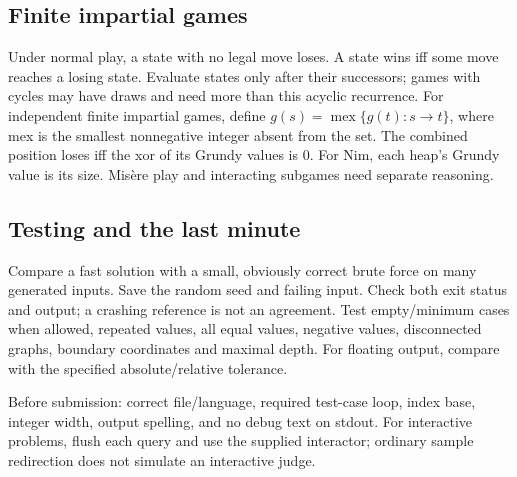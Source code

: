 \subsection{Finite impartial games}\label{algo:games}
Under normal play, a state with no legal move loses. A state wins iff
some move reaches a losing state. Evaluate states only after their successors;
games with cycles may have draws and need more than this acyclic recurrence.
For independent finite impartial games, define
$g(s)=\operatorname{mex}\{g(t):s\to t\}$, where mex is the smallest
nonnegative integer absent from the set. The combined position loses iff
the xor of its Grundy values is 0. For Nim, each heap's Grundy value is its
size. Mis\`ere play and interacting subgames need separate reasoning.

\subsection{Testing and the last minute}\label{algo:testing}
Compare a fast solution with a small, obviously correct brute force on
many generated inputs. Save the random seed and failing input. Check both
exit status and output; a crashing reference is not an agreement.
Test empty/minimum cases when allowed, repeated values, all equal values,
negative values, disconnected graphs, boundary coordinates and maximal depth.
For floating output, compare with the specified absolute/relative tolerance.

Before submission: correct file/language, required test-case loop, index base,
integer width, output spelling, and no debug text on stdout.
For interactive problems, flush each query and use the supplied interactor;
ordinary sample redirection does not simulate an interactive judge.
